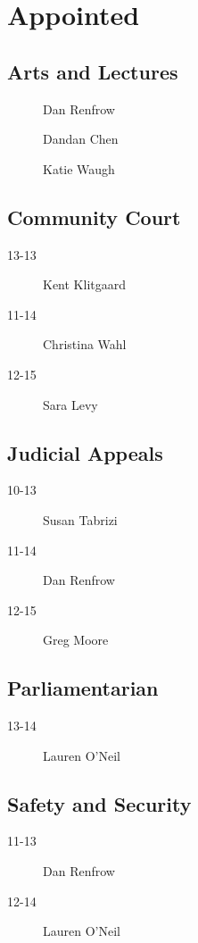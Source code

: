 \documentclass[10pt, twocolumn]{amsart}
\begin{document}
\section*{Appointed}
\subsection*{Arts and Lectures}
\begin{description}
\item[] Dan Renfrow
\item[] Dandan Chen
\item[] Katie Waugh
\end{description}

\subsection*{Community Court}
\begin{description}
\item[13-13] Kent Klitgaard
\item[11-14] Christina Wahl
\item[12-15] Sara Levy
\end{description}

\subsection*{Judicial Appeals}
\begin{description}
\item[10-13] Susan Tabrizi
\item[11-14] Dan Renfrow
\item[12-15] Greg Moore
\end{description}

\subsection*{Parliamentarian}
\begin{description}
\item[13-14] Lauren O'Neil
\end{description}

\subsection*{Safety and Security}
\begin{description}
\item[11-13] Dan Renfrow
\item[12-14] Lauren O'Neil
\end{description}
\vfill
\pagebreak
\end{document}
